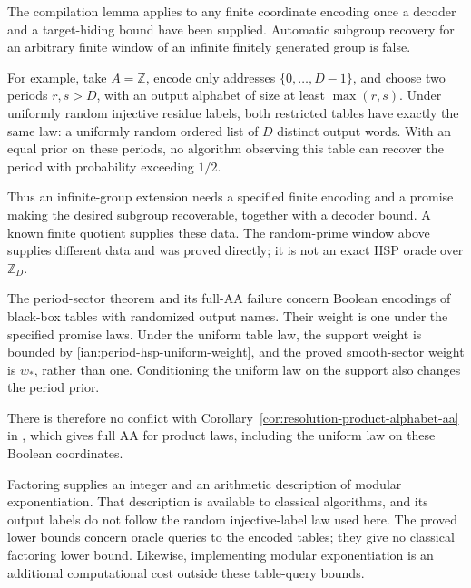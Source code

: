 \begin{remark}\label{ian:period-hsp-infinite-scope}
The compilation lemma applies to any finite coordinate encoding once a decoder and a target-hiding bound have been supplied. Automatic subgroup recovery for an arbitrary finite window of an infinite finitely generated group is false.

For example, take \(A=\mathbb Z\), encode only addresses
\(\{0,\ldots,D-1\}\), and choose two periods \(r,s>D\), with an output alphabet of size at least \(\max(r,s)\). Under uniformly random injective residue labels, both restricted tables have exactly the same law: a uniformly random ordered list of \(D\) distinct output words. With an equal prior on these periods, no algorithm observing this table can recover the period with probability exceeding \(1/2\).

Thus an infinite-group extension needs a specified finite encoding and a promise making the desired subgroup recoverable, together with a decoder bound. A known finite quotient supplies these data. The random-prime window above supplies different data and was proved directly; it is not an exact HSP oracle over \(\mathbb Z_D\).
\end{remark}

\begin{remark}\label{ian:period-hsp-oracle-scope}
The period-sector theorem and its full-AA failure concern Boolean encodings of black-box tables with randomized output names. Their weight is one under the specified promise laws. Under the uniform table law, the support weight is bounded by
\eqref{ian:period-hsp-uniform-weight}, and the proved smooth-sector weight is \(w_*\), rather than one. Conditioning the uniform law on the support also changes the period prior.

There is therefore no conflict with Corollary~\ref{cor:resolution-product-alphabet-aa} in
, which gives full AA for product laws, including the uniform law on these Boolean coordinates.

Factoring supplies an integer and an arithmetic description of modular exponentiation. That description is available to classical algorithms, and its output labels do not follow the random injective-label law used here. The proved lower bounds concern oracle queries to the encoded tables; they give no classical factoring lower bound. Likewise, implementing modular exponentiation is an additional computational cost outside these table-query bounds.
\end{remark}
